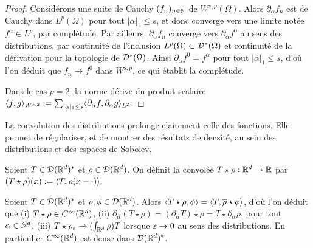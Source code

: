 \begin{proof}
	Considérons une suite de Cauchy $(f_n)_{n \in \mathbb{N}}$ de $W^{s,p}(\Omega)$. Alors $\partial_\alpha f_n$ est de Cauchy dans $L^p(\Omega)$ pour tout $|\alpha|_1 \leq s$, et donc converge vers une limite notée $f^\alpha \in L^p$, par complétude. 
	Par ailleurs, $\partial_\alpha f_n$ converge vers $\partial_\alpha f^0$ au sens des distributions, par continuité de l'inclusion $L^p(\Omega) \subset \mathcal{D}^*(\Omega)$ et continuité de la dérivation pour la topologie de $\mathcal{D}^*(\Omega)$. Ainsi $\partial_\alpha f^0 = f^\alpha$ pour tout $|\alpha|_1 \leq s$, d'où l'on déduit que $f_n \to f^0$ dans $W^{s,p}$, ce qui établit la complétude. 
	
	Dans le cas $p=2$, la norme dérive du produit scalaire $\langle f,g\rangle_{W^{s,2}} := \sum_{|\alpha|_1 \leq s} \langle\partial_\alpha f,\partial_\alpha g\rangle_{L^2}$. 
\end{proof}


La convolution des distributions prolonge clairement celle des fonctions. 
Elle permet de régulariser, et de montrer des résultats de densité, au sein des distributions et des espaces de Sobolev.


\begin{definition}	
\label{def:convolDistrib}
%
	Soient $T \in \mathcal{D}(\mathbb{R}^d)^*$ et $\rho \in \mathcal{D}(\mathbb{R}^d)$. On définit la convolée $T \star \rho : \mathbb{R}^d \to \mathbb{R}$ par 
	$
		(T \star \rho) (x) := \langle T, \rho(x - \cdot)\rangle.
	$
\end{definition}

\begin{proposition}
\label{prop:convolDistrib}
%
	Soient $T \in \mathcal{D}(\mathbb{R}^d)^*$ et $\rho,\phi \in \mathcal{D}(\mathbb{R}^d)$. 
	Alors $\langle T \star \rho, \phi\rangle = \langle T,\overline \rho \star \phi\rangle$, d'où l'on déduit que 
	(i) $T \star \rho \in C^\infty (\mathbb{R}^d)$, 
	(ii) $\partial_\alpha (T\star \rho) = (\partial_\alpha T) \star \rho = T \star \partial_\alpha \rho$, pour tout $\alpha \in \mathbb{N}^d$, 
	(iii) $T \star \rho_\varepsilon \rightharpoonup (\int_{\mathbb{R}^d} \rho) T $ lorsque $\varepsilon \to 0$ au sens des distributions. En particulier $C^\infty(\mathbb{R}^d)$ est dense dans $\mathcal{D}(\mathbb{R}^d)^*$. 
\end{proposition}

